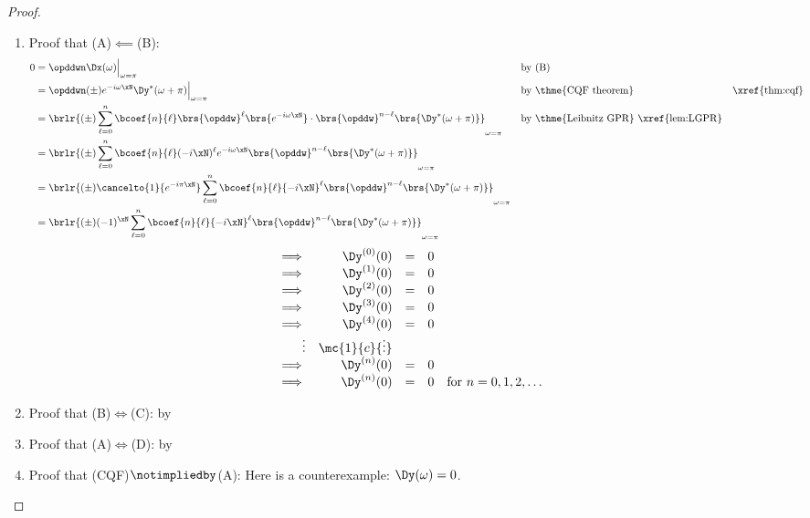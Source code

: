 \begin{proof}
\begin{enumerate}
  \item Proof that (A)$\impliedby$(B): 
    \begin{align*}
      0
        &= \opddwn\Dx(\omega)\Big|_{\omega=\pi}
        && \text{by (B)}
      \\&= \opddwn(\pm) e^{-i\omega\xN} \Dy^\ast(\omega+\pi)\Big|_{\omega=\pi}
        && \text{by \thme{CQF theorem}}
        && \text{\xref{thm:cqf}}
      \\&= \brlr{(\pm) \sum_{\ell=0}^n \bcoef{n}{\ell} \brs{\opddw}^\ell\brs{e^{-i\omega\xN}}\cdot\brs{\opddw}^{n-\ell}\brs{\Dy^\ast(\omega+\pi)}}_{\omega=\pi}
        && \text{by \thme{Leibnitz GPR} \xref{lem:LGPR}}
      \\&= \brlr{(\pm) \sum_{\ell=0}^n \bcoef{n}{\ell} (-i\xN)^\ell e^{-i\omega\xN}\brs{\opddw}^{n-\ell}\brs{\Dy^\ast(\omega+\pi)}}_{\omega=\pi}
      \\&= \brlr{(\pm) \cancelto{1}{e^{-i\pi\xN}} \sum_{\ell=0}^n \bcoef{n}{\ell} {-i\xN}^\ell \brs{\opddw}^{n-\ell}\brs{\Dy^\ast(\omega+\pi)}}_{\omega=\pi}
      \\&= \brlr{(\pm) (-1)^\xN \sum_{\ell=0}^n \bcoef{n}{\ell} {-i\xN}^\ell \brs{\opddw}^{n-\ell}\brs{\Dy^\ast(\omega+\pi)}}_{\omega=\pi}
    \end{align*}
  \[\begin{array}{r rcl l}
    \implies & \Dy^{(0)}(0) &=& 0 \\
    \implies & \Dy^{(1)}(0) &=& 0 \\
    \implies & \Dy^{(2)}(0) &=& 0 \\
    \implies & \Dy^{(3)}(0) &=& 0 \\
    \implies & \Dy^{(4)}(0) &=& 0 \\
    \vdots   & \mc{1}{c}{\vdots}    \\
    \implies & \Dy^{(n)}(0) &=& 0 \\
    \implies & \Dy^{(n)}(0) &=& 0 & \text{for $n=0,1,2,\ldots$}
  \end{array}\]


  \item Proof that (B)$\iff$(C): by 
  \item Proof that (A)$\iff$(D): by 
  \item Proof that (CQF)$\notimpliedby$(A): Here is a counterexample: $\Dy(\omega)=0$.

\end{enumerate}
\end{proof}





